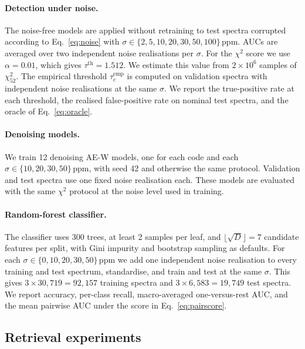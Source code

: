 \paragraph{Detection under noise.}
The noise-free models are applied without retraining to test spectra corrupted according to Eq.~\eqref{eq:noise} with $\sigma\in\{2,5,10,20,30,50,100\}\,\mathrm{ppm}$.
AUCs are averaged over two independent noise realisations per $\sigma$.
For the $\chi^{2}$ score we use $\alpha=0.01$, which gives $\tau^{\mathrm{th}}=1.512$.
We estimate this value from $2\times10^{6}$ samples of $\chi^{2}_{52}$.
The empirical threshold $\tau^{\mathrm{emp}}_c$ is computed on validation spectra with independent noise realisations at the same $\sigma$.
We report the true-positive rate at each threshold, the realised false-positive rate on nominal test spectra, and the oracle of Eq.~\eqref{eq:oracle}.

\paragraph{Denoising models.}
We train 12 denoising AE-W models, one for each code and each $\sigma\in\{10,20,30,50\}\,\mathrm{ppm}$, with seed 42 and otherwise the same protocol.
Validation and test spectra use one fixed noise realisation each.
These models are evaluated with the same $\chi^{2}$ protocol at the noise level used in training.

\paragraph{Random-forest classifier.}
The classifier uses 300 trees, at least 2 samples per leaf, and $\lfloor\sqrt{D}\rfloor=7$ candidate features per split, with Gini impurity and bootstrap sampling as defaults.
For each $\sigma\in\{0,10,20,30,50\}\,\mathrm{ppm}$ we add one independent noise realisation to every training and test spectrum, standardise, and train and test at the same $\sigma$.
This gives $3\times30{,}719=92{,}157$ training spectra and $3\times6{,}583=19{,}749$ test spectra.
We report accuracy, per-class recall, macro-averaged one-versus-rest AUC, and the mean pairwise AUC under the score in Eq.~\eqref{eq:pairscore}.

\subsection{Retrieval experiments}
\label{sec:retsetup}

